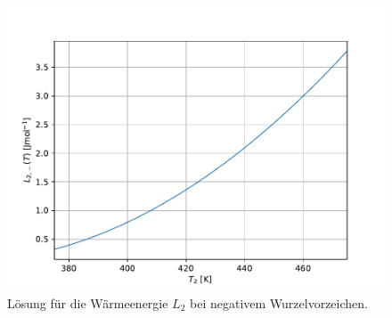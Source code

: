     \begin{figure}[H]
      \centering
      \includegraphics{plot3.pdf}
      \caption{Lösung für die Wärmeenergie $L_2$ bei negativem Wurzelvorzeichen.}
      \label{fig:L_-}
    \end{figure}
%
